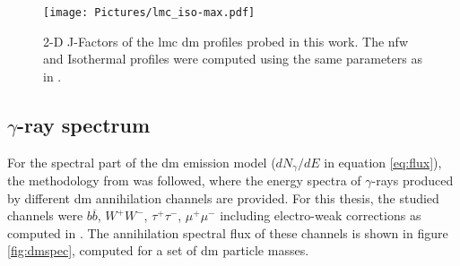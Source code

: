 \documentclass[main.tex]{subfiles}
\begin{document}
\begin{figure}[h]
\endminipage
{}
\texttt{[image: Pictures/lmc\_iso-max.pdf]}
\endminipage
  \caption{2-D J-Factors of the \gls{lmc} \gls{dm} profiles probed in this work. The \gls{nfw} and Isothermal profiles were computed using the same parameters as in \cite{2015FermiLMCDM}.}
    \label{fig:jfactors}
\end{figure}

\subsection{$\gamma$-ray spectrum}

For the spectral part of the \gls{dm} emission model ($dN_{\gamma}/dE$ in equation \ref{eq:flux}), the methodology from \cite{2011cirelli} was followed, where the energy spectra of $\gamma$-rays produced by different \gls{dm} annihilation channels are provided. For this thesis, the studied channels were $b \overline b$, $W^+ W^-$, $\tau^+\tau^-$, $\mu^+ \mu^-$ including electro-weak corrections as computed in \cite{2011EWcorrections}. The annihilation spectral flux of these channels is shown in figure \ref{fig:dmspec}, computed for a set of \gls{dm} particle masses.
\end{document}
